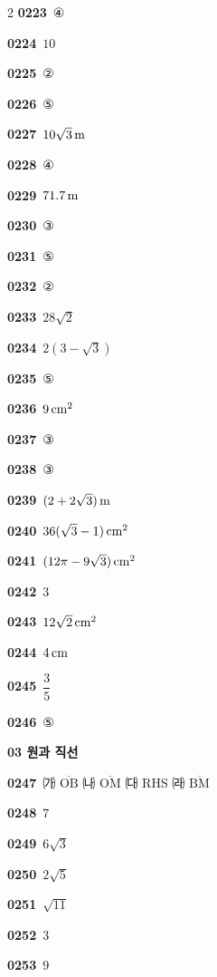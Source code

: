 \documentclass[10pt,a4paper]{article}
\newcommand{\seg}[1]{\overline{\mathrm{#1}}}
\begin{document}
\begin{multicols}{2}
\noindent\textbf{0223}\ ④\par
\noindent\textbf{0224}\ $10$\par
\noindent\textbf{0225}\ ②\par
\noindent\textbf{0226}\ ⑤\par
\noindent\textbf{0227}\ $10\sqrt{3}\mkern3mu \mathrm{m}$\par
\noindent\textbf{0228}\ ④\par
\noindent\textbf{0229}\ $71.7\mkern3mu \mathrm{m}$\par
\noindent\textbf{0230}\ ③\par
\noindent\textbf{0231}\ ⑤\par
\noindent\textbf{0232}\ ②\par
\noindent\textbf{0233}\ $28\sqrt{2}$\par
\noindent\textbf{0234}\ $2(3-\sqrt{3})$\par
\noindent\textbf{0235}\ ⑤\par
\noindent\textbf{0236}\ $9\mkern3mu \mathrm{cm}^2$\par
\noindent\textbf{0237}\ ③\par
\noindent\textbf{0238}\ ③\par
\noindent\textbf{0239}\ $(2+2\sqrt{3})\mkern3mu \mathrm{m}$\par
\noindent\textbf{0240}\ $36(\sqrt{3}-1)\mkern3mu \mathrm{cm}^2$\par
\noindent\textbf{0241}\ $(12\pi-9\sqrt{3})\mkern3mu \mathrm{cm}^2$\par
\noindent\textbf{0242}\ $3$\par
\noindent\textbf{0243}\ $12\sqrt{2}\mkern3mu \mathrm{cm}^2$\par
\noindent\textbf{0244}\ $4\mkern3mu \mathrm{cm}$\par
\noindent\textbf{0245}\ $\dfrac{3}{5}$\par
\noindent\textbf{0246}\ ⑤\par
\noindent\textbf{03 원과 직선}\par\smallskip
\noindent\textbf{0247}\ ㈎ $\seg{OB}$ \quad ㈏ $\seg{OM}$ \quad ㈐ RHS \quad ㈑ $\seg{BM}$\par
\noindent\textbf{0248}\ $7$\par
\noindent\textbf{0249}\ $6\sqrt{3}$\par
\noindent\textbf{0250}\ $2\sqrt{5}$\par
\noindent\textbf{0251}\ $\sqrt{11}$\par
\noindent\textbf{0252}\ $3$\par
\noindent\textbf{0253}\ $9$\par

\end{multicols}
\end{document}
